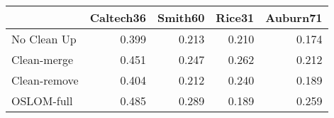 \begin{tabular}{lrrrr}
\toprule
{} & Caltech36 & Smith60 & Rice31 & Auburn71 \\
\midrule
No Clean Up  &     0.399 &   0.213 &  0.210 &    0.174 \\
Clean-merge  &     0.451 &   0.247 &  0.262 &    0.212 \\
Clean-remove &     0.404 &   0.212 &  0.240 &    0.189 \\
OSLOM-full   &     0.485 &   0.289 &  0.189 &    0.259 \\
\bottomrule
\end{tabular}
